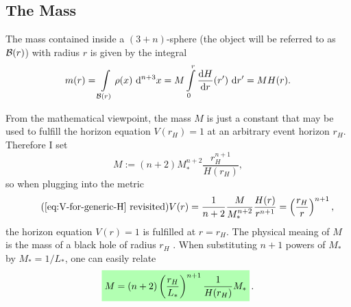 \documentclass[12pt,a4paper]{report}
\numberwithin{equation}{chapter}
\newcommand{\highlight}[1]{%
  \colorbox{green!30}{$\displaystyle#1$}}
\begin{document}
\subsection{The Mass}\label{sec:mass}
The mass contained inside a $(3+n)$-sphere (the object will be referred to as ${\cal B}(r)$) with radius $r$ is given by the integral
\begin{equation}\label{eq:M-integral}
m(r) = \int \limits_{{\cal B}(r)} \rho(x) ~\mathrm{d}^{n+3} x
= M \int \limits_0^r \frac{\mathrm{d} H}{\mathrm{d} r} (r') ~\mathrm{d} r' = M H(r).
\end{equation}
%

From the mathematical viewpoint, the mass $M$ is just a constant that may be used to fulfill the horizon equation $V(r_H)=1$ at an arbitrary event horizon $r_H$. Therefore I set
\begin{equation} \label{eq:M-for-generic-H}
M := (n+2) M_*^{n+2} \frac{r_H^{n+1}}{H(r_H)},
\end{equation}
so when plugging into the metric
\begin{equation} \tag{\ref{eq:V-for-generic-H} revisited}
V(r) = \frac{1}{n+2}
\frac{M}{M_*^{n+2}}
\frac{H(r)}{r^{n+1}}
=
\left(\frac{r_H}{r}\right)^{n+1},
\end{equation}
the horizon equation $V(r)=1$ is fulfilled at $r=r_H$. The physical meaing of $M$ is the mass of a black hole of radius $r_H$ \cite{NS2013}. When substituting $n+1$ powers of $M_*$ by $M_* = 1/L_*$, one can easily relate %
\begin{equation}\label{eq:Mass-rH}
\highlight{
M = (n+2) \left( \frac{r_H}{L_*} \right)^{n+1}
\frac{1}{H(r_H)} M_*
}%
\,.
\end{equation}

\end{document}
